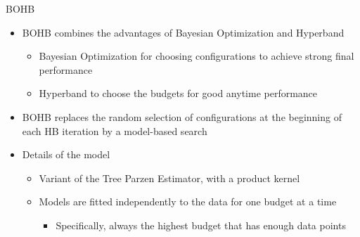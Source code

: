 \begin{frame}[c]{BOHB}
\begin{itemize}
    \item BOHB combines the advantages of Bayesian Optimization and Hyperband
    \begin{itemize} 
        \item Bayesian Optimization for choosing configurations to achieve strong final performance
        \item Hyperband to choose the budgets for good anytime performance    
    \end{itemize}
\pause
\bigskip
    \item BOHB replaces the random selection of configurations at the beginning of each HB iteration by a model-based search
\pause
\bigskip
    \item Details of the model
    \begin{itemize}
        \item Variant of the Tree Parzen Estimator, with a product kernel
        \item Models are fitted independently to the data for one budget at a time
        \begin{itemize}
            \item Specifically, always the highest budget that has enough data points
        \end{itemize}
    \end{itemize}
\end{itemize}

\end{frame}
